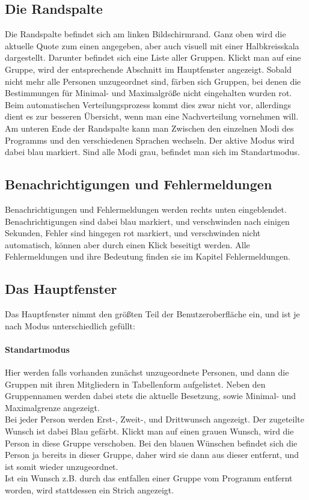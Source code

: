 \documentclass[a4paper,11pt]{article}
\begin{document}
\subsection{Die Randspalte}
\label{ssec:side-bar}
Die Randspalte befindet sich am linken Bildschirmrand. Ganz oben wird die aktuelle Quote zum einen angegeben, aber auch visuell mit einer Halbkreisskala dargestellt. Darunter befindet sich eine Liste aller Gruppen. Klickt man auf eine Gruppe, wird der entsprechende Abschnitt im Hauptfenster angezeigt. Sobald nicht mehr alle Personen unzugeordnet sind, färben sich Gruppen, bei denen die Bestimmungen für Minimal- und Maximalgröße nicht eingehalten wurden rot. Beim automatischen Verteilungsprozess kommt dies zwar nicht vor, allerdings dient es zur besseren Übersicht, wenn man eine Nachverteilung vornehmen will. \\
Am unteren Ende der Randspalte kann man Zwischen den einzelnen Modi des Programms und den verschiedenen Sprachen wechseln. Der aktive Modus wird dabei blau markiert. Sind alle Modi grau, befindet man sich im Standartmodus.

\subsection{Benachrichtigungen und Fehlermeldungen}
\label{ssec:errwindow}
Benachrichtigungen und Fehlermeldungen werden rechts unten eingeblendet. Benachrichtigungen sind dabei blau markiert, und verschwinden nach einigen Sekunden, Fehler sind hingegen rot markiert, und verschwinden nicht automatisch, können aber durch einen Klick beseitigt werden. Alle Fehlermeldungen und ihre Bedeutung finden sie im Kapitel Fehlermeldungen.


\subsection{Das Hauptfenster}
\label{ssec:main-window}
Das Hauptfenster nimmt den größten Teil der Benutzeroberfläche ein, und ist je nach Modus unterschiedlich gefüllt:
\paragraph{Standartmodus}
Hier werden falls vorhanden zunächst unzugeordnete Personen, und dann die Gruppen mit ihren Mitgliedern in Tabellenform aufgelistet. Neben den Gruppennamen werden dabei stets die aktuelle Besetzung, sowie Minimal- und Maximalgrenze angezeigt. \\
Bei jeder Person werden Erst-, Zweit-, und Drittwunsch angezeigt. Der zugeteilte Wunsch ist dabei Blau gefärbt. Klickt man auf einen grauen Wunsch, wird die Person in diese Gruppe verschoben. Bei den blauen Wünschen befindet sich die Person ja bereits in dieser Gruppe, daher wird sie dann aus dieser entfernt, und ist somit wieder unzugeordnet. \\
Ist ein Wunsch z.B. durch das entfallen einer Gruppe vom Programm entfernt worden, wird stattdessen ein Strich angezeigt.
\end{document}
